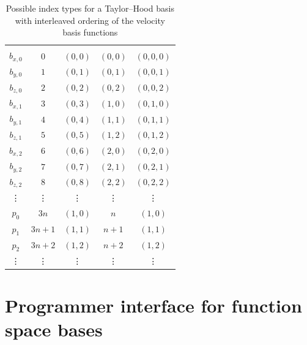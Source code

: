 \documentclass[a4paper,10pt,headings=normal,bibliography=totoc]{scrartcl}
\begin{document}
\begin{table}
 \begin{center}
 \begin{tabular}{c|c|c|c|c}
 \hline \\
  $b_{x,0}$  & $0$    & $(0,0)$ & $(0,0)$ & $(0,0,0)$ \\
  $b_{y,0}$  & $1$    & $(0,1)$ & $(0,1)$ & $(0,0,1)$ \\
  $b_{z,0}$  & $2$    & $(0,2)$ & $(0,2)$ & $(0,0,2)$ \\
  $b_{x,1}$  & $3$    & $(0,3)$ & $(1,0)$ & $(0,1,0)$ \\
  $b_{y,1}$  & $4$    & $(0,4)$ & $(1,1)$ & $(0,1,1)$ \\
  $b_{z,1}$  & $5$    & $(0,5)$ & $(1,2)$ & $(0,1,2)$ \\
  $b_{x,2}$  & $6$    & $(0,6)$ & $(2,0)$ & $(0,2,0)$ \\
  $b_{y,2}$  & $7$    & $(0,7)$ & $(2,1)$ & $(0,2,1)$ \\
  $b_{z,2}$  & $8$    & $(0,8)$ & $(2,2)$ & $(0,2,2)$ \\
    \vdots   & \vdots & \vdots  & \vdots  & \vdots  \\
  $p_0$      & $3n$   & $(1,0)$ & $n$ & $(1,0)$ \\
  $p_1$      & $3n+1$ & $(1,1)$ & $n+1$ & $(1,1)$ \\
  $p_2$      & $3n+2$ & $(1,2)$ & $n+2$ & $(1,2)$ \\
    \vdots   & \vdots & \vdots  & \vdots  & \vdots
 \end{tabular}
 \end{center}
 \caption{Possible index types for a Taylor--Hood basis with interleaved ordering of the velocity basis functions
 \label{tbl:dune_functions:th_multiindices_interleaved}
 }
\end{table}



\section{Programmer interface for function space bases}
\label{sec:dune_functions:function_space_bases_implementation}
\end{document}
